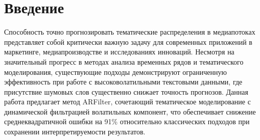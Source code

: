 \documentclass[14pt,a4paper]{article}
\begin{document}





\section{Введение}
Способность точно прогнозировать тематические распределения в медиапотоках представляет собой критически важную задачу для современных приложений в маркетинге, медиапроизводстве и исследованиях инноваций. Несмотря на значительный прогресс в методах анализа временных рядов и тематического моделирования, существующие подходы демонстрируют ограниченную эффективность при работе с высоковолатильными текстовыми данными, где присутствие шумовых слов существенно снижает точность прогнозов. Данная работа предлагает метод ARFilter, сочетающий тематическое моделирование с динамической фильтрацией волатильных компонент, что обеспечивает снижение среднеквадратичной ошибки на 91\% относительно классических подходов при сохранении интерпретируемости результатов.
\end{document}
